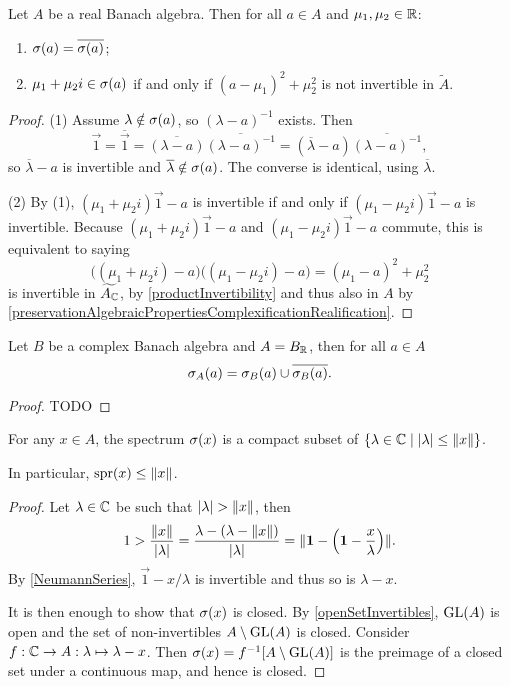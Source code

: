 \begin{lemma}
Let $A$ be a real Banach algebra. Then for all $a\in A$ and $\mu_1,\mu_2\in \mathbb{R}$:
\begin{enumerate}
\item $\sigma(a) = \overline{\sigma(a)}$;
\item $\mu_1 + \mu_2 i \in \sigma(a)$ \textup{if and only if} $(a-\mu_1)^2+\mu_2^2$ is not invertible in $\tilde{A}$.
\end{enumerate}
\end{lemma}
\begin{proof}
(1) Assume $\lambda \notin \sigma(a)$, so $(\lambda-a)^{-1}$ exists. Then
\[ \vec{1} = \overline{\vec{1}} = \overline{(\lambda-a)}\overline{(\lambda-a)^{-1}} = (\overline{\lambda}-a)\overline{(\lambda-a)^{-1}}, \]
so $\overline{\lambda}-a$ is invertible and $\overline{\lambda}\notin \sigma(a)$. The converse is identical, using $\overline{\lambda}$.

(2) By (1), $(\mu_1 + \mu_2 i)\vec{1}- a$ is invertible if and only if $(\mu_1 - \mu_2 i)\vec{1}-a$ is invertible. Because $(\mu_1 + \mu_2 i)\vec{1}-a$ and $(\mu_1 - \mu_2 i)\vec{1}-a$ commute, this is equivalent to saying
\[ \big((\mu_1 + \mu_2 i)-a\big)\big((\mu_1 - \mu_2 i)-a\big) = (\mu_1-a)^2 + \mu_2^2 \]
is invertible in $\widetilde{A_{\mathbb{C}}}$, by \ref{productInvertibility} and thus also in $A$ by \ref{preservationAlgebraicPropertiesComplexificationRealification}.
\end{proof}

\begin{proposition}
Let $B$ be a complex Banach algebra and $A = B_{\mathbb{R}}$, then for all $a\in A$
\[ \sigma_A(a) = \sigma_B(a) \cup \overline{\sigma_B(a)}. \]
\end{proposition}
\begin{proof}
TODO
\end{proof}

\begin{proposition} \label{spectrumCompact}
For any $x\in A$, the spectrum $\sigma(x)$ is a compact subset of $\setbuilder{\lambda\in\C}{|\lambda|\leq \norm{x}}$.

In particular, $\operatorname{spr}(x) \leq \lVert x\rVert$.
\end{proposition}
\begin{proof}
Let $\lambda\in \mathbb{C}$ be such that $|\lambda|>\norm{x}$, then
\[ 1 > \frac{\lVert x\rVert}{|\lambda|} = \frac{\lambda - (\lambda - \lVert x\rVert)}{|\lambda|} = \lVert\boldsymbol{\mathrm{1}} - \left(\boldsymbol{\mathrm{1}} - \frac{x}{\lambda}\right)\rVert. \]
By \ref{NeumannSeries}, $\vec{1} - x/\lambda$ is invertible and thus so is $\lambda-x$.

It is then enough to show that $\sigma(x)$ is closed. By \ref{openSetInvertibles}, $\operatorname{GL}(A)$ is open and the set of non-invertibles $A\setminus \operatorname{GL}(A)$ is closed. Consider $f: \mathbb{C} \to A: \lambda \mapsto \lambda - x$. Then $\sigma(x) = f^{-1}[A\setminus \operatorname{GL}(A)]$ is the preimage of a closed set under a continuous map, and hence is closed.
\end{proof}

